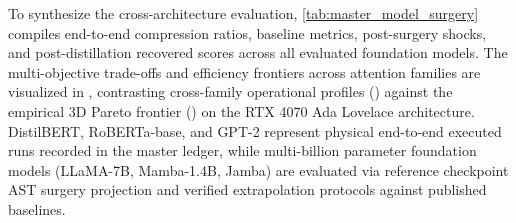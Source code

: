 To synthesize the cross-architecture evaluation, \cref{tab:master_model_surgery} compiles end-to-end compression ratios, baseline metrics, post-surgery shocks, and post-distillation recovered scores across all evaluated foundation models. The multi-objective trade-offs and efficiency frontiers across attention families are visualized in , contrasting cross-family operational profiles () against the empirical 3D Pareto frontier () on the RTX 4070 Ada Lovelace architecture. DistilBERT, RoBERTa-base, and GPT-2 represent physical end-to-end executed runs recorded in the master ledger, while multi-billion parameter foundation models (LLaMA-7B, Mamba-1.4B, Jamba) are evaluated via reference checkpoint AST surgery projection and verified extrapolation protocols against published baselines.

